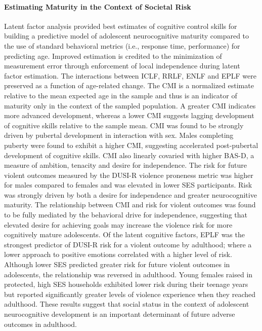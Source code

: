\documentclass[utf8]{frontiersSCNS} %
\begin{document}
\paragraph*{Estimating Maturity in the Context of Societal Risk}
Latent factor analysis provided best estimates of cognitive control skills for building a predictive model of adolescent neurocognitive maturity compared to the use of standard behavioral metrics (i.e., response time, performance) for predicting age. Improved estimation is credited to the minimization of measurement error through enforcement of local independence during latent factor estimation. The interactions between ICLF, RRLF, ENLF and EPLF were preserved as a function of age-related change. The CMI is a normalized estimate relative to the mean expected age in the sample and thus is an indicator of maturity only in the context of the sampled population. A greater CMI indicates more advanced development, whereas a lower CMI suggests lagging development of cognitive skills relative to the sample mean. CMI was found to be strongly driven by pubertal development in interaction with sex. Males completing puberty were found to exhibit a higher CMI, suggesting accelerated post-pubertal development of cognitive skills. CMI also linearly covaried with higher BAS-D, a measure of ambition, tenacity and desire for independence. The risk for future violent outcomes measured by the DUSI-R violence proneness metric was higher for males compared to females and was elevated in lower SES participants. Risk was strongly driven by both a desire for independence and greater neurocognitive maturity. The relationship between CMI and risk for violent outcomes was found to be fully mediated by the behavioral drive for independence, suggesting that elevated desire for achieving goals may increase the violence risk for more cognitively mature adolescents. Of the latent cognitive factors, EPLF was the strongest predictor of DUSI-R risk for a violent outcome by adulthood; where a lower approach to positive emotions correlated with a higher level of risk. Although lower SES predicted greater risk for future violent outcomes in adolescents, the relationship was reversed in adulthood. Young females raised in protected, high SES households exhibited lower risk during their teenage years but reported significantly greater levels of violence experience when they reached adulthood. These results suggest that social status in the context of adolescent neurocognitive development is an important determinant of future adverse outcomes in adulthood. 
\vspace{2pt}
\end{document}
